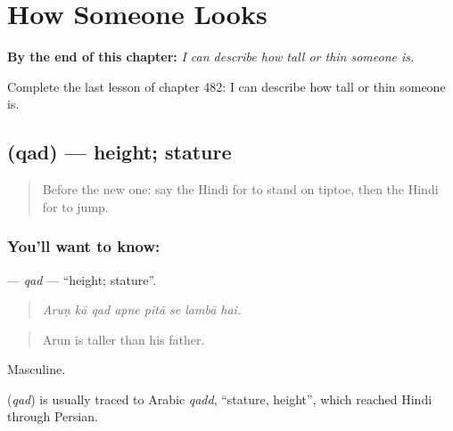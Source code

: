 
\chapter{How Someone Looks}
\label{ch:hi-how-someone-looks}

\begin{chapteropening}
\textbf{By the end of this chapter:} \emph{I can describe how tall or thin someone is.}

Complete the last lesson of chapter 482: I can describe how tall or thin someone is.
\end{chapteropening}

\section[\texorpdfstring{\hi{क़द} (qad)}{क़द (qad)}]{ (qad) — height; stature}

\label{lesson:HI-C482-qad}



\begin{quote}
Before the new one: say the Hindi for to stand on tiptoe, then the Hindi for to jump.
\end{quote}

\subsection*{You'll want to know: }
\textbf{} — \emph{qad} — \textquotedblleft{}height; stature\textquotedblright{}.

\begin{quote}
       
\end{quote}

\begin{quote}
\emph{Aruṇ kā qad apne pitā se lambā hai.}
\end{quote}

\begin{quote}
Arun is taller than his father.
\end{quote}

Masculine.

\begin{cousinweb}
\textbf{} (\emph{qad}) is usually traced to Arabic \emph{qadd}, \textquotedblleft{}stature, height\textquotedblright{}, which reached Hindi through Persian.
\end{cousinweb}

